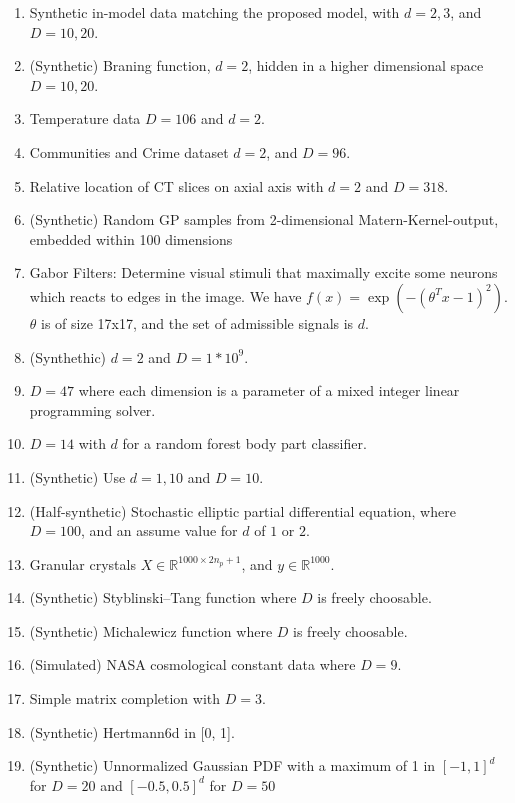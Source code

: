 \begin{enumerate}
\item \citep{Garnett2013} Synthetic in-model data matching the proposed model, with $d=2, 3$, and $D=10, 20$.
\item \citep{Garnett2013} (Synthetic) Braning function, $d=2$, hidden in a higher dimensional space $D=10, 20$.
\item \citep{Garnett2013} Temperature data $D=106$ and $d=2$.
\item \citep{Garnett2013} Communities and Crime dataset $d=2$, and $D=96$. 
\item \citep{Garnett2013} Relative location of CT slices on axial axis with $d = 2$ and $D=318$. 
\item \citep{Djolonga2013} (Synthetic) Random GP samples from 2-dimensional Matern-Kernel-output, embedded within 100 dimensions
\item \citep{Djolonga2013} Gabor Filters: Determine visual stimuli that maximally excite some neurons which reacts to edges in the image.
We have $f(x) = \exp( -( \theta^T x - 1 )^2 )$. $\theta$ is of size 17x17, and the set of admissible signals is $d$.
\item \citep{Wang2013} (Synthethic) $d=2$ and $D=1*10^9$.
\item \citep{Wang2013} $D=47$ where each dimension is a parameter of a mixed integer linear programming solver.
\item \citep{Wang2013} $D=14$ with $d$ for a random forest body part classifier.
\item \citep{Tripathy}  (Synthetic) Use $d=1,10$ and $D=10$.
\item \citep{Tripathy} (Half-synthetic) Stochastic elliptic partial differential equation, where $D=100$, and an assume value for $d$ of $1$ or $2$.
\item \citep{Tripathy} Granular crystals $X \in \mathbb{R}^{1000 \times 2n_p +1}$, and $y \in \mathbb{R}^{1000}$.
\item \citep{Gardner2017} (Synthetic) Styblinski–Tang function where $D$ is freely choosable.
\item \citep{Gardner2017} (Synthetic) Michalewicz function where $D$ is freely choosable.
\item \citep{Gardner2017} (Simulated) NASA cosmological constant data where $D=9$.
\item \citep{Gardner2017} Simple matrix completion with $D=3$.
\item \citep{Rana2017} (Synthetic) Hertmann6d in [0, 1].
\item \citep{Rana2017} (Synthetic) Unnormalized Gaussian PDF with a maximum of 1 in $[-1, 1]^d$ for $D=20$ and $[-0.5, 0.5]^d$ for $D=50$

\end{enumerate}
